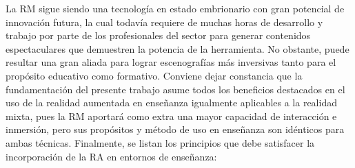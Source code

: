 La RM sigue siendo una tecnología en estado embrionario con gran potencial de innovación futura, la cual todavía requiere de muchas horas de desarrollo y trabajo por parte de los profesionales del sector para generar contenidos espectaculares que demuestren la potencia de la herramienta. No obstante, puede resultar una gran aliada para lograr escenografías más inversivas tanto para el propósito educativo como formativo.
Conviene dejar constancia que la fundamentación del presente trabajo asume todos los beneficios destacados en el uso de la realidad aumentada en enseñanza igualmente aplicables a la realidad mixta, pues la RM aportará como extra una mayor capacidad de interacción e inmersión, pero sus propósitos y método de uso en enseñanza son idénticos para ambas técnicas. Finalmente, se listan los principios que debe satisfacer la incorporación de la RA en entornos de enseñanza:
